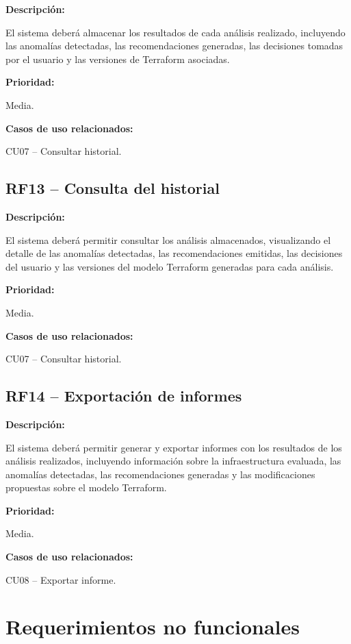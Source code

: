 \noindent \textbf{Descripción:}

El sistema deberá almacenar los resultados de cada análisis realizado, incluyendo las anomalías detectadas, las recomendaciones generadas, las decisiones tomadas por el usuario y las versiones de Terraform asociadas.

\noindent \textbf{Prioridad:}

Media.

\noindent \textbf{Casos de uso relacionados:}

\noindent CU07 -- Consultar historial.

\subsection{RF13 -- Consulta del historial}

\noindent \textbf{Descripción:}

El sistema deberá permitir consultar los análisis almacenados, visualizando el detalle de las anomalías detectadas, las recomendaciones emitidas, las decisiones del usuario y las versiones del modelo Terraform generadas para cada análisis.

\noindent \textbf{Prioridad:}

Media.

\noindent \textbf{Casos de uso relacionados:}

\noindent CU07 -- Consultar historial.

\subsection{RF14 -- Exportación de informes}

\noindent \textbf{Descripción:}

El sistema deberá permitir generar y exportar informes con los resultados de los análisis realizados, incluyendo información sobre la infraestructura evaluada, las anomalías detectadas, las recomendaciones generadas y las modificaciones propuestas sobre el modelo Terraform.

\noindent \textbf{Prioridad:}

Media.

\noindent \textbf{Casos de uso relacionados:}

\noindent CU08 -- Exportar informe.

\section{Requerimientos no funcionales}

